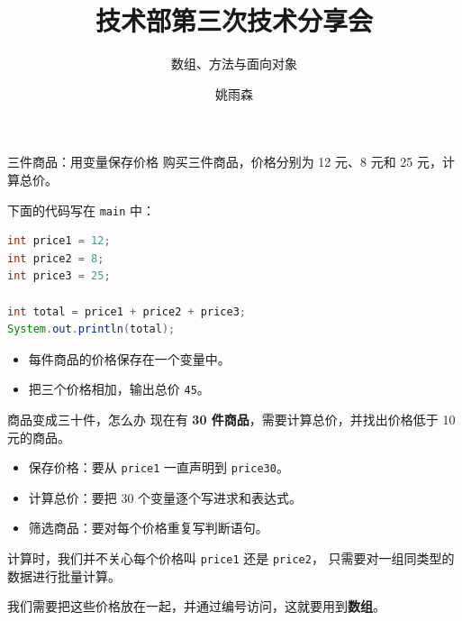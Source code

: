 \documentclass[aspectratio=169]{beamer}
\title[技术部第三次分享]{技术部第三次技术分享会}
\subtitle{数组、方法与面向对象}
\author{姚雨森}
\institute{技术部 分管主席}
\date{}
\begin{document}
\maketitle

\begin{frame}[fragile]{三件商品：用变量保存价格}
  购买三件商品，价格分别为 12 元、8 元和 25 元，计算总价。
  \par\medskip
  下面的代码写在 \texttt{main} 中：
  \begin{lstlisting}[language=Java]
int price1 = 12;
int price2 = 8;
int price3 = 25;

int total = price1 + price2 + price3;
System.out.println(total);
  \end{lstlisting}
  \begin{itemize}
    \item 每件商品的价格保存在一个变量中。
    \item 把三个价格相加，输出总价 \texttt{45}。
  \end{itemize}
\end{frame}

\begin{frame}{商品变成三十件，怎么办}
  现在有 \textbf{30 件商品}，需要计算总价，并找出价格低于 10 元的商品。
  \par\medskip
  \begin{itemize}
    \item 保存价格：要从 \texttt{price1} 一直声明到 \texttt{price30}。
    \item 计算总价：要把 30 个变量逐个写进求和表达式。
    \item 筛选商品：要对每个价格重复写判断语句。
  \end{itemize}
  \medskip
  计算时，我们并不关心每个价格叫 \texttt{price1} 还是 \texttt{price2}，
  只需要对\alert{一组同类型的数据进行批量计算}。
  \par\medskip
  我们需要把这些价格\alert{放在一起，并通过编号访问}，这就要用到\textbf{数组}。
\end{frame}
\end{document}
